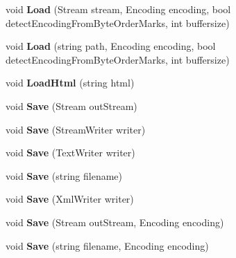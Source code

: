 \begin{DoxyCompactItemize}
void {\bfseries Load} (Stream stream, Encoding encoding, bool detect\+Encoding\+From\+Byte\+Order\+Marks, int buffersize)
\item 
\mbox{\label{class_html_agility_pack_1_1_html_document_a553cb5a86bf0ee3ef5bfca82d4ac53da}} 
void {\bfseries Load} (string path, Encoding encoding, bool detect\+Encoding\+From\+Byte\+Order\+Marks, int buffersize)
\item 
\mbox{\label{class_html_agility_pack_1_1_html_document_a79fc8e1cb117701ebed62d98ac266934}} 
void {\bfseries Load\+Html} (string html)
\item 
\mbox{\label{class_html_agility_pack_1_1_html_document_a6b4268c9c7eef3ee96d47e6e9b6a2ee8}} 
void {\bfseries Save} (Stream out\+Stream)
\item 
\mbox{\label{class_html_agility_pack_1_1_html_document_a6f796eece6d20e32c1da69e762f43e3b}} 
void {\bfseries Save} (Stream\+Writer writer)
\item 
\mbox{\label{class_html_agility_pack_1_1_html_document_a807a732ac65a41587c17bbb9effabd68}} 
void {\bfseries Save} (Text\+Writer writer)
\item 
\mbox{\label{class_html_agility_pack_1_1_html_document_a5f1fa7de7fc1667c52aeb2bdd67e4a35}} 
void {\bfseries Save} (string filename)
\item 
\mbox{\label{class_html_agility_pack_1_1_html_document_a604211ba10c90bad128eb9787ad75939}} 
void {\bfseries Save} (Xml\+Writer writer)
\item 
\mbox{\label{class_html_agility_pack_1_1_html_document_a15de9d07bec41ccc6cfc6d73595d290b}} 
void {\bfseries Save} (Stream out\+Stream, Encoding encoding)
\item 
\mbox{\label{class_html_agility_pack_1_1_html_document_afb3166f6dc7649e5ba93a13e44aeb3f2}} 
void {\bfseries Save} (string filename, Encoding encoding)
\end{DoxyCompactItemize}
